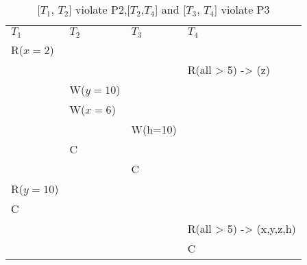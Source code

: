 \begin{table}[h]
    \begin{tabular}{l|l|l|l}
        $T_1$            & $T_2$            & $T_3$   & $T_4$   \\
    R($x = 2$)  &           &        &  \\
                &           &        & R(all > 5) -> (z)     \\
                & W($y = 10$)&        &  \\
                & W($x = 6$)&        &      \\
                &           & W(h=10)&     \\
                & C         &        &      \\
                &           & C      &      \\
    R($y = 10$)  &           &        &      \\
    C           &           &        &      \\
                &           &        & R(all > 5) -> (x,y,z,h)     \\
                &           &        & C    
    \end{tabular}
    \caption{[$T_1$, $T_2$] violate P2,[$T_2$,$T_4$] and [$T_3$, $T_4$] violate P3}
\end{table}